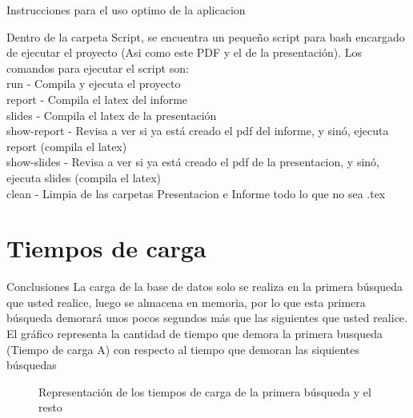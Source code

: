 \documentclass{beamer}
\begin{document}
\begin{frame}{Instrucciones para el uso optimo de la aplicacion}
    \begin{center}
	Dentro de la carpeta Script, se encuentra un pequeño script para bash encargado de ejecutar el proyecto (Asi como este PDF y el de la presentación). Los comandos para ejecutar el script son:
\\run - Compila y ejecuta el proyecto
\\report - Compila el latex del informe
\\slides - Compila el latex de la presentación
\\show-report - Revisa a ver si ya está creado el pdf del informe, y sinó, ejecuta report (compila el latex)
\\show-slides - Revisa a ver si ya está creado el pdf de la presentacion, y sinó, ejecuta slides (compila el latex)
\\clean - Limpia de las carpetas Presentacion e Informe todo lo que no sea .tex       
    \end{center}
\end{frame}



\section{Tiempos de carga}

\begin{frame}{Conclusiones}
   La carga de la base de datos solo se realiza en la primera búsqueda que usted realice, luego se 
almacena en memoria, por lo que esta primera búsqueda demorará unos pocos segundos
más que las siguientes que usted realice. El gráfico representa la cantidad de tiempo que demora la primera busqueda (Tiempo de carga A) con respecto al tiempo que demoran las siquientes búsquedas

\begin{figure}[H]
  \centering
  \caption{Representación de los tiempos de carga de la primera búsqueda y el resto}
  \label{fig:grafico-barras}
\end{figure}
\end{frame}
\end{document}
